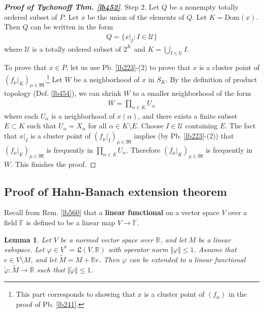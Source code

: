\documentclass[12pt,b5paper,notitlepage]{article}
\theoremstyle{definition}
\theoremstyle{plain}
\newtheorem{lm}[df]{Lemma}
\newcommand{\fk}{\mathfrak}
\newcommand{\wtd}{\widetilde}
\newcommand{\Dom}{\mathrm{Dom}}
\newcommand{\scr}{\mathscr}
\newcommand{\Rbb}{\mathbb R}
\newcommand{\Fbb}{\mathbb F}
\numberwithin{equation}{section}
\begin{document}
\begin{proof}[\textbf{Proof of Tychonoff Thm. \ref{lb452}}]
Step 2. Let $Q$ be a nonempty totally ordered subset of $P$. Let $x$ be the union of the elements of $Q$. Let $K=\Dom(x)$. Then $Q$ can be written in the form
\begin{align*}
Q=\{x|_I:I\in\scr U\}
\end{align*}
where $\scr U$ is a totally ordered subset of $2^K$ and $K=\bigcup_{I\in\scr U}I$.



To prove that $x\in P$,  let us use Pb. \ref{lb223}-(2) to prove that $x$ is a cluster point of $(f_\mu|_K)_{\mu\in\fk M}$.\footnote{This part corresponds to showing that $x$ is a cluster point of $(f_\alpha)$ in the proof of Pb. \ref{lb241}.} Let $W$ be a neighborhood of $x$ in $S_K$. By the definition of product topology (Def. \ref{lb454}), we can shrink $W$ to a smaller neighborhood of the form
\begin{align*}
W=\prod_{\alpha\in K}U_\alpha
\end{align*}
where each $U_\alpha$ is a neighborhood of $x(\alpha)$, and there exists a finite subset $E\subset K$ such that $U_\alpha=X_\alpha$ for all $\alpha\in K\setminus E$. Choose $I\in\scr U$ containing $E$. The fact that $x|_I$ is a cluster point of $(f_\mu|_I)_{\mu\in\fk M}$ implies (by Pb. \ref{lb223}-(2)) that $(f_\mu|_E)_{\mu\in\fk M}$ is frequently in $\prod_{\alpha\in E}U_\alpha$. Therefore $(f_\mu|_K)_{\mu\in\fk M}$ is frequently in $W$. This finishes the proof.
\end{proof}



\subsection{Proof of Hahn-Banach extension theorem}

Recall from Rem. \ref{lb560} that a \textbf{linear functional} on a vector space $V$ over a field $\Fbb$ is defined to be a linear map $V\rightarrow\Fbb$.

\begin{lm}\label{lb498}
Let $V$ be a normed vector space over $\Rbb$, and let $M$ be a linear subspace. Let $\varphi\in V^*=\fk L(V,\Rbb)$ with operator norm $\Vert\varphi\Vert\leq 1$. Assume that $e\in V\setminus M$, and let $\wtd M=M+\Rbb e$. Then $\varphi$ can be extended to a linear functional $\wtd\varphi:\wtd M\rightarrow\Rbb$ such that $\Vert\wtd \varphi\Vert\leq 1$. 
\end{lm}
\end{document}
